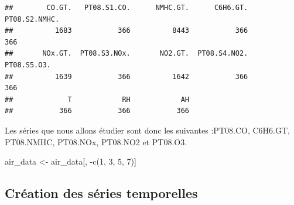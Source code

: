 \documentclass[
]{article}
\newenvironment{Shaded}{\begin{snugshade}}{\end{snugshade}}
\newcommand{\DecValTok}[1]{\textcolor[rgb]{0.00,0.00,0.81}{#1}}
\newcommand{\FunctionTok}[1]{\textcolor[rgb]{0.00,0.00,0.00}{#1}}
\newcommand{\NormalTok}[1]{#1}
\newcommand{\OtherTok}[1]{\textcolor[rgb]{0.56,0.35,0.01}{#1}}
\newcommand{\SpecialCharTok}[1]{\textcolor[rgb]{0.00,0.00,0.00}{#1}}
\begin{document}
\begin{verbatim}
##        CO.GT.   PT08.S1.CO.      NMHC.GT.      C6H6.GT. PT08.S2.NMHC. 
##          1683           366          8443           366           366 
##       NOx.GT.  PT08.S3.NOx.       NO2.GT.  PT08.S4.NO2.   PT08.S5.O3. 
##          1639           366          1642           366           366 
##             T            RH            AH 
##           366           366           366
\end{verbatim}

Les séries que nous allons étudier sont donc les suivantes
:\newline PT08.CO, C6H6.GT, PT08.NMHC, PT08.NOx, PT08.NO2 et PT08.O3.

\begin{Shaded}
\begin{Highlighting}[]
\NormalTok{air\_data }\OtherTok{\textless{}{-}}\NormalTok{ air\_data[, }\SpecialCharTok{{-}}\FunctionTok{c}\NormalTok{(}\DecValTok{1}\NormalTok{, }\DecValTok{3}\NormalTok{, }\DecValTok{5}\NormalTok{, }\DecValTok{7}\NormalTok{)]}
\end{Highlighting}
\end{Shaded}

\hypertarget{cruxe9ation-des-suxe9ries-temporelles}{%
\subsection{Création des séries
temporelles}\label{cruxe9ation-des-suxe9ries-temporelles}}
\end{document}
